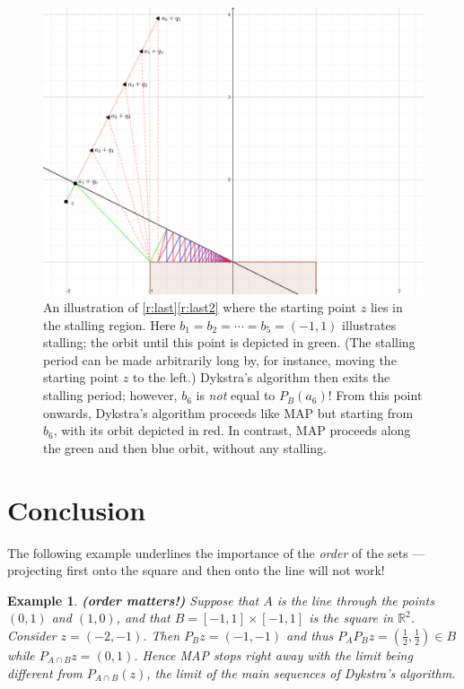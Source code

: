 \documentclass[12pt]{article}
\newcommand{\thalb}{\ensuremath{\tfrac{1}{2}}}
\newcommand{\RR}{\ensuremath{\mathbb R}}
\newtheorem{example}[theorem]{Example}
\providecommand{\RR}{\mathbb{R}}
\providecommand{\RR}{\mathbb{R}}
\begin{document}
\begin{figure}[h!]
  \begin{center}
  \includegraphics[scale=3.0]{DifferentSequences}
  \caption{An illustration of \cref{r:last}\ref{r:last2} 
  where the starting point $z$ lies in the stalling region.
  Here $b_1 = b_2 = \cdots = b_5 = (-1,1)$ illustrates stalling;
  the orbit until this point is depicted in green. 
  (The stalling period can be made arbitrarily long by, for instance, 
   moving the starting point $z$ to the left.)
  Dykstra's algorithm then exits the stalling period; however, 
  $b_6$ is \emph{not} equal to $P_B(a_6)$! From this point 
  onwards, Dykstra's algorithm proceeds like MAP but starting from $b_6$, 
  with its orbit depicted in red. 
  In contrast, MAP proceeds along the green and then blue orbit, 
  without any stalling. 
  }
  \label{fig:orbits}
  \end{center}
\end{figure}

\section{Conclusion}

\label{s:conc}

The following example underlines 
the importance of the \emph{order} of the sets --- 
projecting first onto the square and then onto the line will not work!

\begin{example} {\rm\bf (order matters!)}
Suppose 
that $A$ is the line through the points $(0,1)$ and $(1,0)$, and that 
$B = [-1,1]\times[-1,1]$ is the square in $\RR^2$. 
Consider $z=(-2,-1)$.
Then $P_Bz = (-1,-1)$ and thus $P_AP_Bz = (\thalb,\thalb)\in B$
while $P_{A\cap B}z = (0,1)$.
Hence MAP stops right away with the limit being
different from $P_{A\cap B}(z)$, the limit 
of the main sequences of Dykstra's algorithm. 
\end{example}
\end{document}
